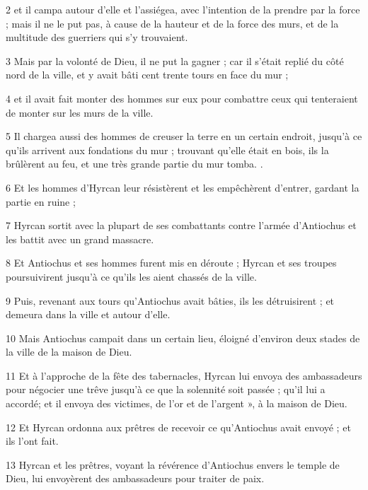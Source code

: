 \par 2 et il campa autour d'elle et l'assiégea, avec l'intention de la prendre par la force ; mais il ne le put pas, à cause de la hauteur et de la force des murs, et de la multitude des guerriers qui s'y trouvaient.

\par 3 Mais par la volonté de Dieu, il ne put la gagner ; car il s'était replié du côté nord de la ville, et y avait bâti cent trente tours en face du mur ;

\par 4 et il avait fait monter des hommes sur eux pour combattre ceux qui tenteraient de monter sur les murs de la ville.

\par 5 Il chargea aussi des hommes de creuser la terre en un certain endroit, jusqu'à ce qu'ils arrivent aux fondations du mur ; trouvant qu'elle était en bois, ils la brûlèrent au feu, et une très grande partie du mur tomba. .

\par 6 Et les hommes d'Hyrcan leur résistèrent et les empêchèrent d'entrer, gardant la partie en ruine ;

\par 7 Hyrcan sortit avec la plupart de ses combattants contre l'armée d'Antiochus et les battit avec un grand massacre.

\par 8 Et Antiochus et ses hommes furent mis en déroute ; Hyrcan et ses troupes poursuivirent jusqu'à ce qu'ils les aient chassés de la ville.

\par 9 Puis, revenant aux tours qu'Antiochus avait bâties, ils les détruisirent ; et demeura dans la ville et autour d'elle.

\par 10 Mais Antiochus campait dans un certain lieu, éloigné d'environ deux stades de la ville de la maison de Dieu.

\par 11 Et à l'approche de la fête des tabernacles, Hyrcan lui envoya des ambassadeurs pour négocier une trêve jusqu'à ce que la solennité soit passée ; qu'il lui a accordé; et il envoya des victimes, de l'or et de l'argent », à la maison de Dieu.

\par 12 Et Hyrcan ordonna aux prêtres de recevoir ce qu'Antiochus avait envoyé ; et ils l'ont fait.

\par 13 Hyrcan et les prêtres, voyant la révérence d'Antiochus envers le temple de Dieu, lui envoyèrent des ambassadeurs pour traiter de paix.

